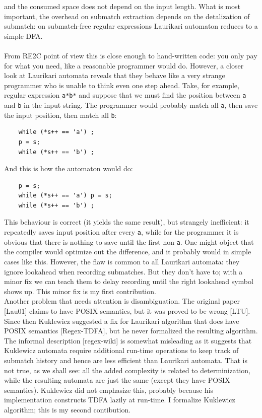 \documentclass{article}
\theoremstyle{definition}
\begin{document}
\begin{multicols}{2}
and the consumed space does not depend on the input length.
What is most important, the overhead on submatch extraction depends on the detalization of submatch:
on submatch-free regular expressions Laurikari automaton reduces to a simple DFA.
\\ \\
From RE2C point of view this is close enough to hand-written code:
you only pay for what you need, like a reasonable programmer would do.
However, a closer look at Laurikari automata reveals that
they behave like a very strange programmer who is unable to think even one step ahead.
Take, for example, regular expression \texttt{a*b*}
and suppose that we must find the position between \texttt{a} and \texttt{b} in the input string.
The programmer would probably match all \texttt{a}, then save the input position, then match all \texttt{b}:

\begin{small}
\begin{verbatim}
    while (*s++ == 'a') ;
    p = s;
    while (*s++ == 'b') ;
\end{verbatim}
\end{small}

And this is how the automaton would do:

\begin{small}
\begin{verbatim}
    p = s;
    while (*s++ == 'a') p = s;
    while (*s++ == 'b') ;
\end{verbatim}
\end{small}

This behaviour is correct (it yields the same result), but strangely inefficient:
it repeatedly saves input position after every \texttt{a},
while for the programmer it is obvious that there is nothing to save until the first non-\texttt{a}.
One might object that the compiler would optimize out the difference,
and it probably would in simple cases like this.
However, the flaw is common to all Laurikari automata:
they ignore lookahead when recording submatches.
But they don't have to; with a minor fix we can teach them
to delay recording until the right lookahead symbol shows up.
This minor fix is my first contribution.
\\

Another problem that needs attention is disambiguation.
The original paper [Lau01] claims to have POSIX semantics, but it was proved to be wrong [LTU].
Since then Kuklewicz suggested a fix for Laurikari algorithm that does have POSIX semantics [Regex-TDFA], but he never formalized the resulting algorithm.
The informal description [regex-wiki] is somewhat misleading as it suggests that Kuklewicz automata
require additional run-time operations to keep track of submatch history and hence are less efficient than Laurikari automata.
That is not true, as we shall see: all the added complexity is related to determinization,
while the resulting automata are just the same (except they have POSIX semantics).
Kuklewicz did not emphasize this, probably because his implementation constructs TDFA lazily at run-time.
I formalize Kuklewicz algorithm; this is my second contibution.
\\


\end{multicols}
\end{document}
